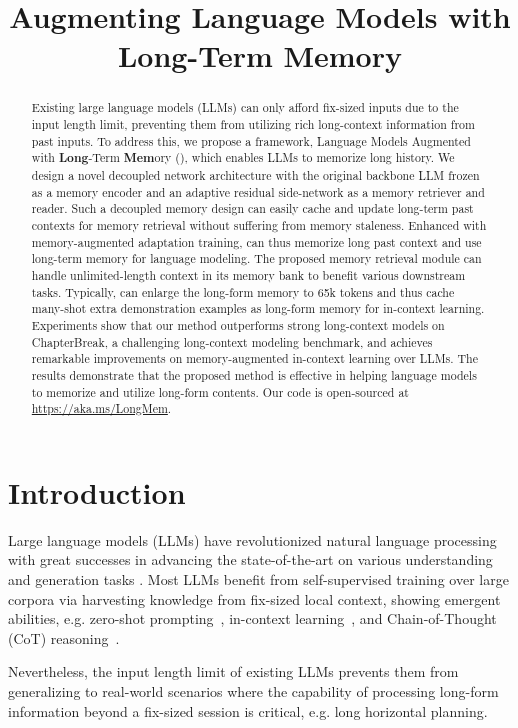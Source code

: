 \title{Augmenting Language Models with Long-Term Memory}

\begin{abstract}
Existing large language models (LLMs) can only afford fix-sized inputs due to the input length limit, preventing them from utilizing rich long-context information from past inputs. To address this, we propose a framework, Language Models Augmented with \textbf{Long}-Term \textbf{Mem}ory (\our{}), which enables LLMs to memorize long history. We design a novel decoupled network architecture with the original backbone LLM frozen as a memory encoder and an adaptive residual side-network as a memory retriever and reader. Such a decoupled memory design can easily cache and update long-term past contexts for memory retrieval without suffering from memory staleness. Enhanced with memory-augmented adaptation training, \our{} can thus memorize long past context and use long-term memory for language modeling. The proposed memory retrieval module can handle unlimited-length context in its memory bank to benefit various downstream tasks. Typically, \our{} can enlarge the long-form memory to 65k tokens and thus cache many-shot extra demonstration examples as long-form memory for in-context learning. Experiments show that our method outperforms strong long-context models on ChapterBreak, a challenging long-context modeling benchmark, and achieves remarkable improvements on memory-augmented in-context learning over LLMs. The results demonstrate that the proposed method is effective in helping language models to memorize and utilize long-form contents. Our code is open-sourced at \url{https://aka.ms/LongMem}.
\end{abstract}

\section{Introduction}
\label{sec:intro}
Large language models (LLMs) have revolutionized natural language processing with great successes in advancing the state-of-the-art on various understanding and generation tasks \citep{bert,gpt2,roberta,Yang2019XLNetGA,gpt3,t5}. Most LLMs benefit from self-supervised training over large corpora via harvesting knowledge from fix-sized local context, showing emergent abilities, e.g. zero-shot prompting~\citep{gpt2}, in-context learning~\citep{gpt3}, and Chain-of-Thought (CoT) reasoning~\citep{cot}.

Nevertheless, the input length limit of existing LLMs prevents them from generalizing to real-world scenarios where the capability of processing long-form information beyond a fix-sized session is critical, e.g. long horizontal planning.

